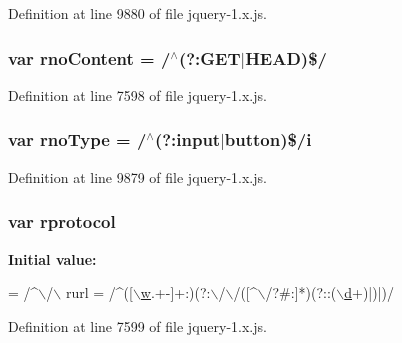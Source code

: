 Definition at line 9880 of file jquery-\/1.\+x.\+js.

\subsubsection[{\texorpdfstring{rno\+Content}{rnoContent}}]{\setlength{\rightskip}{0pt plus 5cm}var rno\+Content = /$^\wedge$(?\+:G\+ET$\vert$H\+E\+AD)\$/}\hypertarget{jquery-1_8x_8js_a537d744d72e31ec312aa3f16ef576d3f}{}\label{jquery-1_8x_8js_a537d744d72e31ec312aa3f16ef576d3f}


Definition at line 7598 of file jquery-\/1.\+x.\+js.

\subsubsection[{\texorpdfstring{rno\+Type}{rnoType}}]{\setlength{\rightskip}{0pt plus 5cm}var rno\+Type = /$^\wedge$(?\+:input$\vert$button)\$/{\bf i}}\hypertarget{jquery-1_8x_8js_aba62df0b2591b6534016a48daf198df4}{}\label{jquery-1_8x_8js_aba62df0b2591b6534016a48daf198df4}


Definition at line 9879 of file jquery-\/1.\+x.\+js.

\subsubsection[{\texorpdfstring{rprotocol}{rprotocol}}]{\setlength{\rightskip}{0pt plus 5cm}var rprotocol}\hypertarget{jquery-1_8x_8js_a0f02b710647fcf95e74593954fb9b4cb}{}\label{jquery-1_8x_8js_a0f02b710647fcf95e74593954fb9b4cb}
{\bfseries Initial value\+:}
\begin{DoxyCode}
= /^\(\backslash\)/\(\backslash\)
    rurl = /^([\hyperlink{jquery-1_8x_8min_8js_a9721a992655f700bdc2e91ba68b71e26}{\(\backslash\)w}.+-]+:)(?:\(\backslash\)/\(\backslash\)/([^\(\backslash\)/?#:]*)(?::(\hyperlink{jquery-1_8x_8min_8js_aee5af4e0aaa2cfde6be1272633d18b59}{\(\backslash\)d}+)|)|)/
\end{DoxyCode}


Definition at line 7599 of file jquery-\/1.\+x.\+js.

